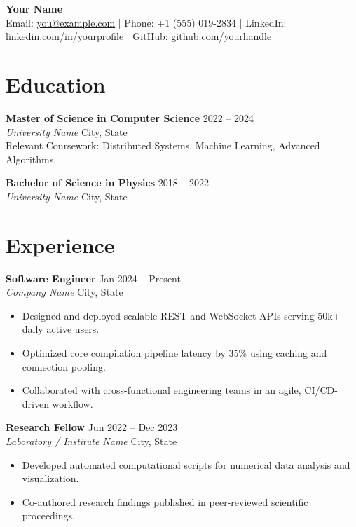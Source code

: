 \documentclass[a4paper, 10pt]{article}
\begin{document}
\begin{center}
  {\Huge \textbf{Your Name}} \\ \vspace{4pt}
  \small \color{muted}
  Email: \href{mailto:you@example.com}{you@example.com} \quad | \quad
  Phone: +1 (555) 019-2834 \quad | \quad
  LinkedIn: \href{https://linkedin.com}{linkedin.com/in/yourprofile} \quad | \quad
  GitHub: \href{https://github.com}{github.com/yourhandle}
\end{center}

\vspace{6pt}

\section{Education}
\textbf{Master of Science in Computer Science} \hfill 2022 -- 2024 \\
\textit{University Name} \hfill City, State \\
Relevant Coursework: Distributed Systems, Machine Learning, Advanced Algorithms.

\vspace{3pt}
\textbf{Bachelor of Science in Physics} \hfill 2018 -- 2022 \\
\textit{University Name} \hfill City, State

\section{Experience}
\textbf{Software Engineer} \hfill Jan 2024 -- Present \\
\textit{Company Name} \hfill City, State
\begin{itemize}
  \item Designed and deployed scalable REST and WebSocket APIs serving 50k+ daily active users.
  \item Optimized core compilation pipeline latency by 35\% using caching and connection pooling.
  \item Collaborated with cross-functional engineering teams in an agile, CI/CD-driven workflow.
\end{itemize}

\vspace{3pt}
\textbf{Research Fellow} \hfill Jun 2022 -- Dec 2023 \\
\textit{Laboratory / Institute Name} \hfill City, State
\begin{itemize}
  \item Developed automated computational scripts for numerical data analysis and visualization.
  \item Co-authored research findings published in peer-reviewed scientific proceedings.
\end{itemize}
\end{document}
